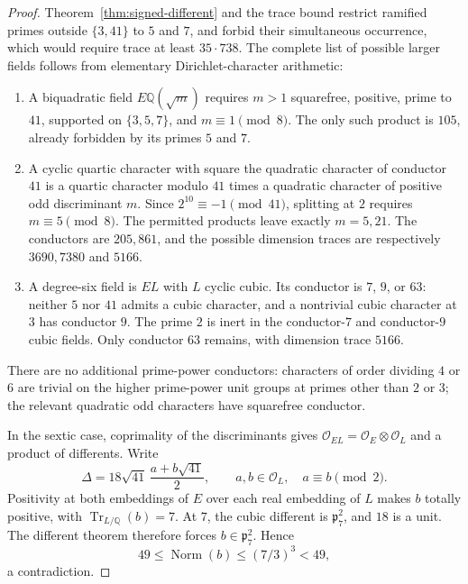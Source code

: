 \begin{proof}
Theorem~\ref{thm:signed-different} and the trace bound restrict ramified
primes outside $\{3,41\}$ to $5$ and $7$, and forbid their simultaneous
occurrence, which would require trace at least $35\cdot738$.
The complete list of possible larger fields follows from elementary
Dirichlet-character arithmetic:
\begin{enumerate}
\item A biquadratic field $E\mathbb Q(\sqrt m)$ requires $m>1$ squarefree,
positive, prime to $41$, supported on $\{3,5,7\}$, and $m\equiv1\pmod8$.
The only such product is $105$, already forbidden by its primes $5$ and $7$.
\item A cyclic quartic character with square the quadratic character of
conductor $41$ is a quartic character modulo $41$ times a quadratic
character of positive odd discriminant $m$. Since $2^{10}\equiv-1\pmod{41}$,
splitting at $2$ requires $m\equiv5\pmod8$. The permitted products leave
exactly $m=5,21$. The conductors are $205,861$, and the possible dimension
traces are respectively $3690,7380$ and $5166$.
\item A degree-six field is $E L$ with $L$ cyclic cubic. Its conductor is
$7$, $9$, or $63$: neither $5$ nor $41$ admits a cubic character, and a
nontrivial cubic character at $3$ has conductor $9$. The prime $2$ is inert
in the conductor-$7$ and conductor-$9$ cubic fields. Only conductor $63$
remains, with dimension trace $5166$.
\end{enumerate}
There are no additional prime-power conductors: characters of order dividing
$4$ or $6$ are trivial on the higher prime-power unit groups at primes other
than $2$ or $3$; the relevant quadratic odd characters have squarefree conductor.

In the sextic case, coprimality of the discriminants gives
$\mathcal O_{EL}=\mathcal O_E\otimes\mathcal O_L$ and a product of differents.
Write
\[
 \Delta=18\sqrt{41}\,\frac{a+b\sqrt{41}}2,
 \qquad a,b\in\mathcal O_L,\quad a\equiv b\pmod2.
\]
Positivity at both embeddings of $E$ over each real embedding of $L$ makes
$b$ totally positive, with $\operatorname{Tr}_{L/\mathbb Q}(b)=7$.
At $7$, the cubic different is $\mathfrak p_7^2$, and $18$ is a unit.
The different theorem therefore forces $b\in\mathfrak p_7^2$. Hence
\[
 49\le\operatorname{Norm}(b)\le(7/3)^3<49,
\]
a contradiction.


\end{proof}
